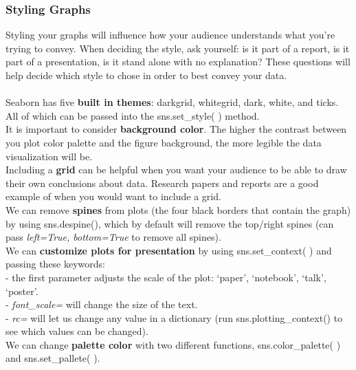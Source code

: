 \documentclass[11pt, a4paper]{article}
\begin{document}
\begin{spacing}{1.1}
	\subsubsection{Styling Graphs}
	Styling your graphs will influence how your audience understands what you're trying to convey. When deciding the style, ask yourself: is it part of a report, is it part of a presentation, is it stand alone with no explanation? These questions will help decide which style to chose in order to best convey your data. \\~\\
	Seaborn has five \textbf{built in themes}: darkgrid, whitegrid, dark, white, and ticks. All of which can be passed into the sns.set\_style( ) method. \vspace*{2mm} \\
	It is important to consider \textbf{background color}. The higher the contrast between you plot color palette and the figure background, the more legible the data visualization will be. \vspace*{2mm} \\
	Including a \textbf{grid} can be helpful when you want your audience to be able to draw their own conclusions about data. Research papers and reports are a good example of when you would want to include a grid.\vspace*{2mm} \\
	We can remove \textbf{spines} from plots (the four black borders that contain the graph) by using sns.despine(), which by default will remove the top/right spines (can pass \textit{left=True, bottom=True} to remove all spines).\vspace*{2mm} \\
	We can \textbf{customize plots for presentation} by using sns.set\_context( ) and passing these keywords: \\
	\hspace*{3mm} - the first parameter adjusts the scale of the plot: `paper', `notebook', `talk', `poster'. \\
	\hspace*{3mm} - \textit{font\_scale=} will change the size of the text. \\
	\hspace*{3mm} - \textit{rc=} will let us change any value in a dictionary (run sns.plotting\_context() to see which values can 
	\hspace*{5.5mm} be changed). \vspace*{2mm} \\
	We can change \textbf{palette color} with two different functions, sns.color\_palette( ) and sns.set\_pallete( ). \\

\end{spacing}
\end{document}
